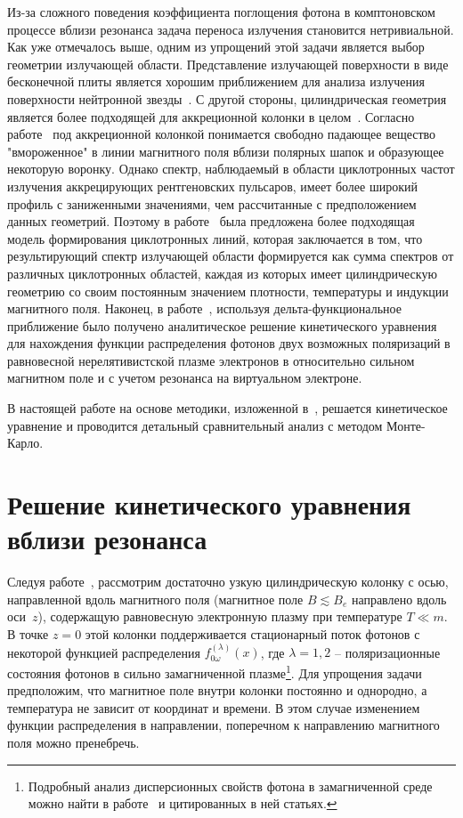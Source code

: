 \documentclass[14pt, russian]{article}
\begin{document}
Из-за сложного поведения коэффициента поглощения фотона в комптоновском процессе вблизи резонанса задача переноса излучения становится нетривиальной. Как уже отмечалось выше, одним из упрощений этой задачи является выбор геометрии излучающей области. Представление излучающей поверхности в виде бесконечной плиты является хорошим приближением для анализа излучения поверхности нейтронной звезды~\cite{Meszaros:1983,Harding:1984,Nishimura:2015}. С другой стороны, цилиндрическая геометрия является более подходящей для аккреционной колонки в целом~\cite{Basko:1976}. Согласно работе~\cite{Basko:1976}  под аккреционной колонкой понимается свободно падающее вещество "вмороженное" в линии магнитного поля вблизи полярных шапок и образующее некоторую воронку. Однако спектр, наблюдаемый в области циклотронных частот излучения аккрецирующих рентгеновских пульсаров, имеет более широкий профиль с заниженными значениями, чем рассчитанные с предположением данных геометрий. Поэтому в работе~\cite{Nishimura:2008} была предложена более подходящая модель формирования циклотронных линий, которая заключается в том, что результирующий спектр излучающей области формируется как сумма спектров от различных циклотронных областей, каждая из которых имеет цилиндрическую геометрию со своим постоянным значением плотности, температуры и индукции магнитного поля. Наконец, в работе~\cite{YarkovPhotFE:2023}, используя дельта-функциональное приближение было получено аналитическое решение кинетического уравнения для нахождения функции распределения фотонов двух возможных поляризаций в равновесной нерелятивистской плазме электронов в относительно сильном магнитном поле и с учетом резонанса на виртуальном электроне.

В настоящей работе на основе методики, изложенной в~\cite{YarkovPhotFE:2023}, решается кинетическое уравнение и проводится детальный сравнительный анализ с методом Монте-Карло.
\section{Решение кинетического уравнения вблизи резонанса}

Следуя работе~\cite{YarkovPhotFE:2023}, рассмотрим  достаточно узкую цилиндрическую колонку с осью, направленной вдоль магнитного поля (магнитное поле $B\lesssim B_e$ направлено вдоль оси~$z$), содержащую равновесную электронную плазму при температуре $T\ll m$. В точке $z=0$ этой колонки поддерживается стационарный поток фотонов с некоторой функцией распределения $f_{0\omega}^{(\lambda)}(x)$, где $\lambda=1,2$ -- поляризационные состояния фотонов в сильно замагниченной плазме\footnote{Подробный анализ дисперсионных свойств фотона в замагниченной среде можно найти в работе~\cite{Chistyakov:2012} и цитированных в ней статьях.}. Для упрощения задачи предположим, что магнитное поле внутри колонки постоянно и однородно, а температура не зависит от координат и времени. В этом случае изменением функции распределения в направлении, поперечном к направлению магнитного поля можно пренебречь.
\end{document}
